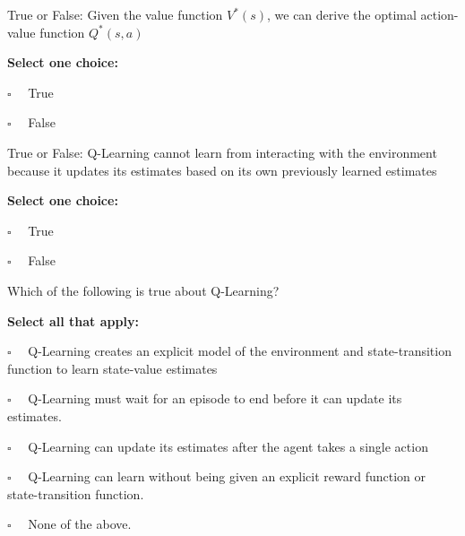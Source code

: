 \documentclass[11pt,addpoints,answers]{exam}
\newcommand{\emptysquare}{{\LARGE $\square$}\ \ }
\newcommand{\filledsquare}{{\LARGE $\boxtimes$}\ \ }
\begin{document}
\begin{questions}
    \question[1] True or False: Given the value function $V^*(s)$, we can derive the optimal action-value function $Q^*(s,a)$ 
    
    \textbf{Select one choice:}
    \begin{list}{}
        \item 
            \emptysquare 
            True
        \item 
            \emptysquare
            False
    
    \end{list}
    
    
    
    \question[1] True or False: Q-Learning cannot learn from  interacting with the environment because it updates its estimates based on its own previously learned estimates 
    
    \textbf{Select one choice:}
    \begin{list}{}
        \item 
            \emptysquare 
            True
        \item 
            \emptysquare
            False
    
    \end{list}
    
    \question[2] Which of the following is true about  Q-Learning?
    
    
    \textbf{Select all that apply:}
    \begin{list}{}
        \item 
            \emptysquare 
            Q-Learning creates an explicit model of the environment and state-transition function to learn state-value estimates
        \item 
            \emptysquare 
            Q-Learning must wait for an episode to end before it can update its estimates.
        \item 
            \emptysquare 
            Q-Learning can update its estimates after the agent takes a single action
        \item 
            \emptysquare 
            Q-Learning can learn without being given an explicit reward function or state-transition function.
        \item 
            \emptysquare 
            None of the above.
    \end{list}
    

\end{questions}
\end{document}
